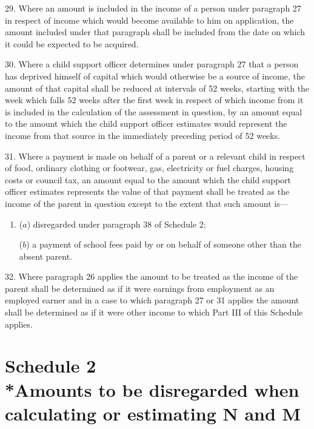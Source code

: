 \documentclass[a4paper]{article}
\begin{document}
29.  Where an amount is included in the income of a person under paragraph 27 in respect of income which would become available to him on application, the amount included under that paragraph shall be included from the date on which it could be expected to be acquired.

\medskip

30.  Where a child support officer determines under paragraph 27 that a person has deprived himself of capital which would otherwise be a source of income, the amount of that capital shall be reduced at intervals of 52 weeks, starting with the week which falls 52 weeks after the first week in respect of which income from it is included in the calculation of the assessment in question, by an amount equal to the amount which the child support officer estimates would represent the income from that source in the immediately preceding period of 52 weeks.

\medskip

31.  Where a payment is made on behalf of a parent or a relevant child in respect of food, ordinary clothing or footwear, gas, electricity or fuel charges, housing costs or council tax, an amount equal to the amount which the child support officer estimates represents the value of that payment shall be treated as the income of the parent in question except to the extent that such amount is—
\begin{enumerate}\item[]
($a$) disregarded under paragraph 38 of Schedule 2;

($b$) a payment of school fees paid by or on behalf of someone other than the absent parent.
\end{enumerate}

\medskip

32.  Where paragraph 26 applies the amount to be treated as the income of the parent shall be determined as if it were earnings from employment as an employed earner and in a case to which paragraph 27 or 31 applies the amount shall be determined as if it were other income to which Part III of this Schedule applies.

\part[Schedule 2 --- Amounts to be disregarded when calculating or estimating N and M]{Schedule 2\\*Amounts to be disregarded when calculating or estimating N and M}
\end{document}

